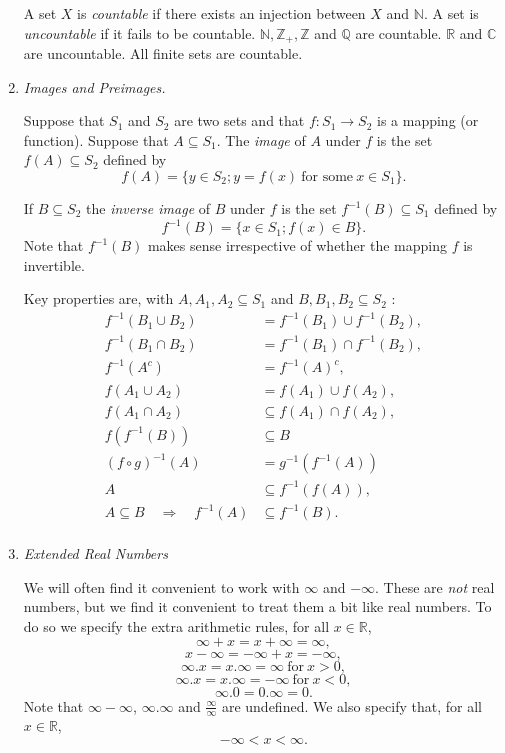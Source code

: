 \documentclass[a4paper]{report}
\newcounter{thm_counter}[chapter]
\numberwithin{equation}{chapter}
\numberwithin{thm_counter}{section}
\def\mb{\mathbb} %
\def\R{\mb{R}} %
\def\C{\mb{C}} %
\def\N{\mb{N}}
\def\Q{\mb{Q}}
\def\Z{\mb{Z}}
\begin{document}
\begin{enumerate}
A set $X$ is {\it countable} if there exists an injection between $X$ and $\N$. A set is {\it uncountable} if it fails to be countable. $\N, \Z_{+}, \Z$ and $\Q$ are countable. $\R$ and $\C$ are uncountable.
All finite sets are countable.

\item {\it Images and Preimages.}

Suppose that $S_{1}$ and $S_{2}$ are two sets and that $f:S_{1} \rightarrow S_{2}$ is a mapping (or function). Suppose that $A \subseteq S_{1}$. The {\it image} of $A$ under $f$ is the set $f(A) \subseteq S_{2}$ defined by
$$ f(A) = \{y \in S_{2}; y = f(x)~\mbox{for some}~x \in S_{1}\}.$$

If $B \subseteq S_{2}$ the {\it inverse image} of $B$ under $f$ is the set $f^{-1}(B) \subseteq S_{1}$ defined by
$$ f^{-1}(B) = \{x \in S_{1} ; f(x) \in B\}.$$
Note that $f^{-1}(B)$ makes sense irrespective of whether the mapping $f$ is invertible.

Key properties are, with $A, A_{1}, A_{2} \subseteq S_{1}$ and $B, B_{1}, B_{2} \subseteq S_{2}$ :
$$\begin{aligned}
 f^{-1}(B_{1} \cup B_{2}) &= f^{-1}(B_{1}) \cup f^{-1}(B_{2}),\\
 f^{-1}(B_{1} \cap B_{2}) &= f^{-1}(B_{1}) \cap f^{-1}(B_{2}),\\
 f^{-1}(A^{c}) &= f^{-1}(A)^{c},\\
 f(A_{1} \cup A_{2}) &= f(A_{1}) \cup f(A_{2}),\\
 f(A_{1} \cap A_{2}) &\subseteq f(A_{1}) \cap f(A_{2}),\\
 f(f^{-1}(B)) &\subseteq B~~\\
 (f\circ g)^{-1}(A) &= g^{-1}(f^{-1}(A)) \\ 
 A &\subseteq f^{-1}(f(A)),\\
 A \subseteq B \quad \Rightarrow \quad f^{-1}(A) &\subseteq f^{-1}(B).\\
\end{aligned}$$



\item {\it Extended Real Numbers}

We will often find it convenient to work with $\infty$ and $-\infty$. These are \textit{not} real numbers, but we find it convenient to treat them a bit like real numbers. To do so we specify the extra arithmetic rules, for all $x\in\R$, 
$$ \infty + x = x + \infty = \infty,$$
$$ x - \infty = -\infty + x = -\infty,$$
$$ \infty. x = x.\infty = \infty~\mbox{for}~x > 0,$$
$$ \infty. x = x.\infty = -\infty~\mbox{for}~x < 0,$$
$$ \infty.0 = 0.\infty = 0.$$
Note that $\infty - \infty$, $\infty.\infty$ and $\frac{\infty}{\infty}$ are undefined. 
We also specify that, for all $x\in\R$, 
$$-\infty < x < \infty.$$


\end{enumerate}
\end{document}
